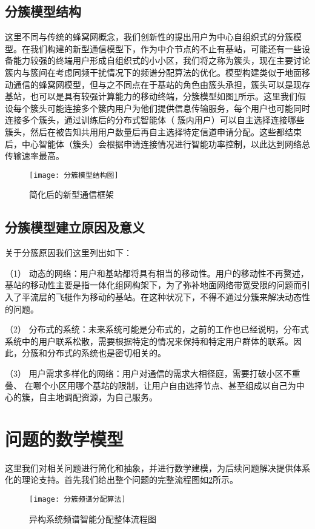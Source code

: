 \subsection{分簇模型结构}
这里不同与传统的蜂窝网概念，我们创新性的提出用户为中心自组织式的分簇模型。在我们构建的新型通信模型下，作为中介节点的不止有基站，可能还有一些设备能力较强的终端用户形成自组织式的小小区，我们将之称为簇头，现在主要讨论簇内与簇间在考虑同频干扰情况下的频谱分配算法的优化。模型构建类似于地面移动通信的蜂窝网模型，但与之不同点在于基站的角色由簇头承担，簇头可以是现存基站，也可以是具有较强计算能力的移动终端，分簇模型如图\ref{fig:分簇模型结构图}所示。这里我们假设每个簇头可能连接多个簇内用户为他们提供信息传输服务，每个用户也可能同时连接多个簇头，通过训练后的分布式智能体（ 簇内用户）可以自主选择连接哪些簇头，然后在被告知共用用户数量后再自主选择特定信道申请分配。这些都结束后，中心智能体（簇头）会根据申请连接情况进行智能功率控制，以此达到网络总传输速率最高。
\begin{figure}[h]
	\centering
	\texttt{[image: 分簇模型结构图]}
	\caption{简化后的新型通信框架}
	\label{fig:分簇模型结构图}
\end{figure}

\subsection{分簇模型建立原因及意义}
关于分簇原因我们这里列出如下：

（1） 动态的网络：用户和基站都将具有相当的移动性。用户的移动性不再赘述，基站的移动性主要是指一体化组网构架下，为了弥补地面网络带宽受限的问题而引入了平流层的飞艇作为移动的基站。在这种状况下，不得不通过分簇来解决动态性的问题。

（2） 分布式的系统：未来系统可能是分布式的，之前的工作也已经说明，分布式系统中的用户联系松散，需要根据特定的情况来保持和特定用户群体的联系。因此，分簇和分布式的系统也是密切相关的。

（3） 用户需求多样化的网络：用户对通信的需求大相径庭，需要打破小区不重叠、 在哪个小区用哪个基站的限制，让用户自由选择节点、甚至组成以自己为中心的簇，自主地调配资源，为自己服务。

\section{问题的数学模型}
这里我们对相关问题进行简化和抽象，并进行数学建模，为后续问题解决提供体系化的理论支持。首先我们给出整个问题的完整流程图如\ref{fig：整体流程图}所示。
\begin{figure}[htbp]
	\centering
	\texttt{[image: 分簇频谱分配算法]}
	\caption{异构系统频谱智能分配整体流程图}
	\label{fig：整体流程图}
\end{figure}

